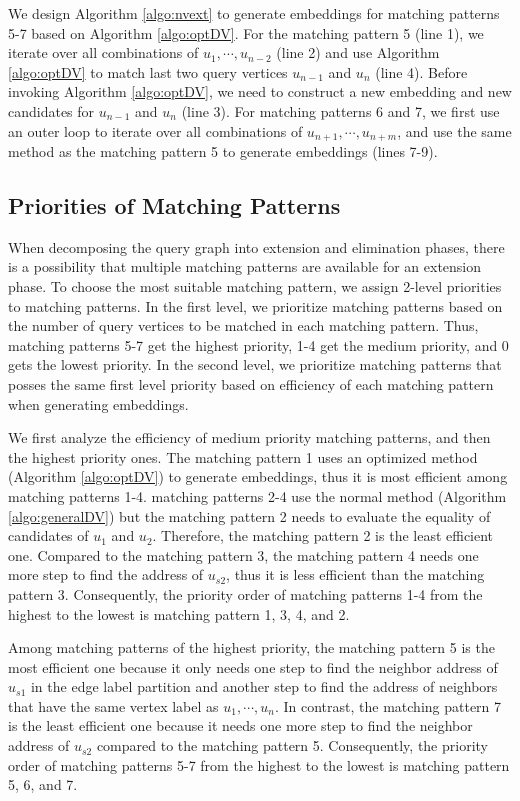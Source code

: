 We design Algorithm \ref{algo:nvext} to generate embeddings for matching patterns 5-7 based on Algorithm \ref{algo:optDV}. For the matching pattern 5 (line 1), we iterate over all combinations of $u_1, \cdots, u_{n-2}$ (line 2) and use Algorithm \ref{algo:optDV} to match last two query vertices $u_{n-1}$ and $u_n$ (line 4). Before invoking Algorithm \ref{algo:optDV}, we need to construct a new embedding and new candidates for $u_{n-1}$ and $u_n$ (line 3). For matching patterns 6 and 7, we first use an outer loop to iterate over all combinations of $u_{n+1}, \cdots, u_{n+m}$, and use the same method as the matching pattern 5 to generate embeddings (lines 7-9).

\subsection{Priorities of Matching Patterns}
When decomposing the query graph into extension and elimination phases, there is a possibility that multiple matching patterns are available for an extension phase. To choose the most suitable matching pattern, we assign 2-level priorities to matching patterns. In the first level, we prioritize matching patterns based on the number of query vertices to be matched in each matching pattern. Thus, matching patterns 5-7 get the highest priority, 1-4 get the medium priority, and 0 gets the lowest priority. In the second level, we prioritize matching patterns that posses the same first level priority based on efficiency of each matching pattern when generating embeddings.

We first analyze the efficiency of medium priority matching patterns, and then the highest priority ones. The matching pattern 1 uses an optimized method (Algorithm \ref{algo:optDV}) to generate embeddings, thus it is most efficient among matching patterns 1-4. matching patterns 2-4 use the normal method (Algorithm \ref{algo:generalDV}) but the matching pattern 2 needs to evaluate the equality of candidates of $u_1$ and $u_2$. Therefore, the matching pattern 2 is the least efficient one. Compared to the matching pattern 3, the matching pattern 4 needs one more step to find the address of $u_{s2}$, thus it is less efficient than the matching pattern 3. Consequently, the priority order of matching patterns 1-4 from the highest to the lowest is matching pattern 1, 3, 4, and 2.

Among matching patterns of the highest priority, the matching pattern 5 is the most efficient one because it only needs one step to find the neighbor address of $u_{s1}$ in the edge label partition and another step to find the address of neighbors that have the same vertex label as $u_1, \cdots, u_n$. In contrast, the matching pattern 7 is the least efficient one because it needs one more step to find the neighbor address of $u_{s2}$ compared to the matching pattern 5. Consequently, the priority order of matching patterns 5-7 from the highest to the lowest is matching pattern 5, 6, and 7.


